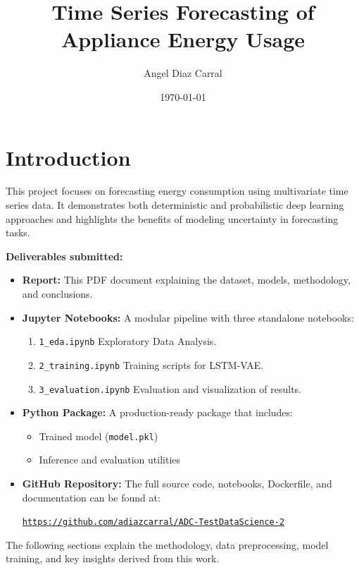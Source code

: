 \documentclass{article}
\title{Time Series Forecasting of Appliance Energy Usage}
\author{Angel Diaz Carral}
\date{\today}
\begin{document}
\maketitle

\section{Introduction}

This project focuses on forecasting energy consumption using multivariate time series data. It demonstrates both deterministic and probabilistic deep learning approaches and highlights the benefits of modeling uncertainty in forecasting tasks.

\vspace{0.5em}
\noindent\textbf{Deliverables submitted:}
\begin{itemize}
  \item \textbf{Report:} This PDF document explaining the dataset, models, methodology, and conclusions.
  \item \textbf{Jupyter Notebooks:} A modular pipeline with three standalone notebooks:
  \begin{enumerate}
    \item \texttt{1\_eda.ipynb} Exploratory Data Analysis.
    \item \texttt{2\_training.ipynb} Training scripts for LSTM-VAE.
    \item \texttt{3\_evaluation.ipynb} Evaluation and visualization of results.
  \end{enumerate}
  \item \textbf{Python Package:} A production-ready package that includes:
  \begin{itemize}
    \item Trained model (\texttt{model.pkl})
    \item Inference and evaluation utilities
  \end{itemize}
  \item \textbf{GitHub Repository:} The full source code, notebooks, Dockerfile, and documentation can be found at:
  \begin{center}
    \texttt{\url{https://github.com/adiazcarral/ADC-TestDataScience-2}}
  \end{center}
\end{itemize}

\vspace{0.5em}
The following sections explain the methodology, data preprocessing, model training, and key insights derived from this work.
\end{document}

